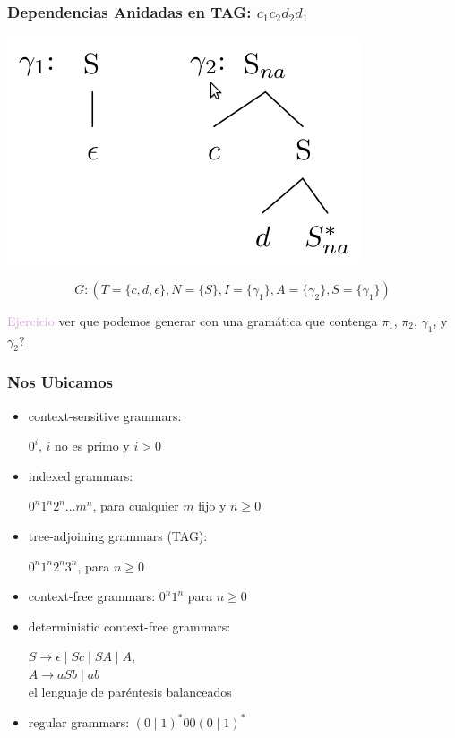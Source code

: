 \documentclass[compress,color=usenames]{beamer}
\newcommand{\mH}[1]{\textcolor{Plum}{#1}}
\begin{document}
\begin{frame}
\frametitle{Dependencias Anidadas en TAG: $c_1c_2d_2d_1$}


\begin{center}
\includegraphics[scale=.4]{pics/pic2-6.jpg}
\end{center}
$$G : (T = \{c, d, \epsilon\}, N = \{S \}, I = \{\gamma_1\}, A = \{\gamma_2\}, S = \{\gamma_1\})$$\pause


\mH{Ejercicio} ver que podemos generar con una gram\'atica que contenga 
$\pi_1$, $\pi_2$, $\gamma_1$, y $\gamma_2$?

\end{frame}

\begin{frame}
\frametitle{Nos Ubicamos}

\begin{itemize}

\item context-sensitive grammars: 
\medskip
\centerline{$0^i$, $i$ no es primo y $i > 0$}\pause

\item indexed grammars: 
\medskip
\centerline{$0^n1^n2^n \ldots m^n$, para cualquier $m$ fijo y $n \geq 0$}\pause


\item tree-adjoining grammars (TAG): 
\medskip
\centerline{$0^n1^n2^n3^n$, para $n \geq 0$}\pause

\item context-free grammars: 
{$0^n1^n$ para $n \geq 0$}\pause


\item deterministic context-free grammars: 
\medskip
\begin{center}
$S \rightarrow \epsilon \mid Sc \mid S A \mid A$,\\
$A \rightarrow a S b \mid ab$\\ 
el lenguaje de par\'entesis balanceados \pause
\end{center}

\item regular grammars: 
{$(0\mid 1)^*00(0\mid 1)^*$}

\end{itemize}

\end{frame}
\end{document}
